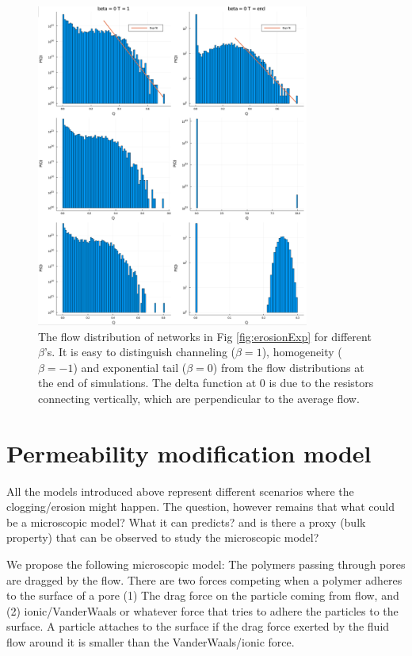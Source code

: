 \begin{figure}[H]
    \centering
    \includegraphics[width = 0.8\textwidth]{Figs/PQ.png}
    \caption{The flow distribution of networks in Fig \ref{fig:erosionExp} for different $\beta$'s. It is easy to distinguish channeling ($\beta = 1$), homogeneity ($\beta = -1$) and exponential tail ($\beta = 0$) from the flow distributions at the end of simulations. The delta function at $0$ is due to the resistors connecting vertically, which are perpendicular to the average flow.}
    \label{fig:PQ}
\end{figure}





\newpage

\section{Permeability modification model}
%
All the models introduced above represent different scenarios where
the clogging/erosion might happen. The question, however remains that
what could be a microscopic model? What it can predicts? and is there
a proxy (bulk property) that can be observed to study the microscopic
model?


We propose the following microscopic model: The polymers passing through pores are dragged by the flow. There are
two forces competing when a polymer adheres to the surface of a pore
(1) The drag force on the particle coming from flow, and (2)
ionic/VanderWaals or whatever force that tries to adhere the particles
to the surface. A particle attaches to the surface if the drag force
exerted by the fluid flow around it is smaller than the
VanderWaals/ionic force.

